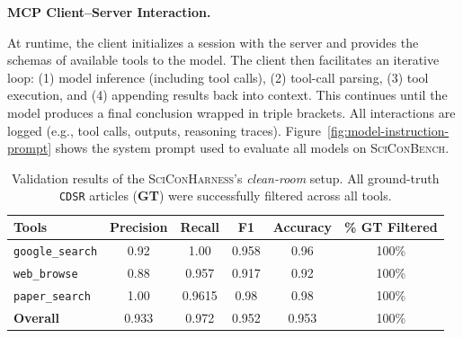 \documentclass{article}
\newcommand{\xhdr}[1]{%
  \noindent\textbf{#1.}
}
\begin{document}
\xhdr{MCP Client--Server Interaction}
At runtime, the client initializes a session with the server and provides the schemas of available tools to the model. The client then facilitates an iterative loop: (1) model inference (including tool calls), (2) tool-call parsing, (3) tool execution, and (4) appending results back into context. This continues until the model produces a final conclusion wrapped in triple brackets. All interactions are logged (e.g., tool calls, outputs, reasoning traces). Figure~\ref{fig:model-instruction-prompt} shows the system prompt used to evaluate all models on \textsc{SciConBench}.

\begin{table}[h]
\centering
\footnotesize
\setlength{\tabcolsep}{4pt}
\centering
\caption{Validation results of the \textsc{SciConHarness}'s \textit{clean-room} setup. All ground-truth \texttt{CDSR} articles (\textbf{GT}) were successfully filtered across all tools.}
\label{tab:filtering-validation}
\begin{tabular}{lccccc}
\toprule
\textbf{Tools} & \textbf{Precision} & \textbf{Recall} & \textbf{F1} & \textbf{Accuracy} & \textbf{\% GT Filtered} \\
\midrule
\texttt{google\_search} & 0.92 & 1.00 & 0.958 & 0.96 & 100\% \\
\texttt{web\_browse} & 0.88 & 0.957 & 0.917 & 0.92 & 100\% \\
\texttt{paper\_search} & 1.00 & 0.9615 & 0.98 & 0.98 & 100\% \\
\midrule
\textbf{Overall} & 0.933 & 0.972 & 0.952 & 0.953 & 100\% \\
\bottomrule
\end{tabular}

\end{table}

\newpage


\end{document}
